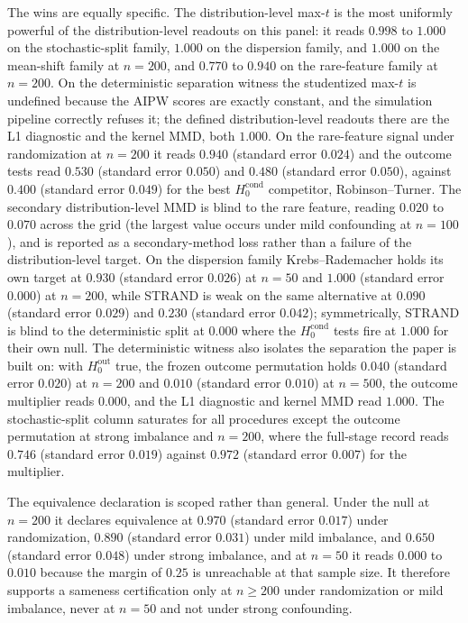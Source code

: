 The wins are equally specific. The distribution-level max-$t$ is the most uniformly powerful of the distribution-level readouts on this panel: it reads $0.998$ to $1.000$ on the stochastic-split family, $1.000$ on the dispersion family, and $1.000$ on the mean-shift family at $n=200$, and $0.770$ to $0.940$ on the rare-feature family at $n=200$. On the deterministic separation witness the studentized max-$t$ is undefined because the AIPW scores are exactly constant, and the simulation pipeline correctly refuses it; the defined distribution-level readouts there are the L1 diagnostic and the kernel MMD, both $1.000$. On the rare-feature signal under randomization at $n=200$ it reads $0.940$ (standard error $0.024$) and the outcome tests read $0.530$ (standard error $0.050$) and $0.480$ (standard error $0.050$), against $0.400$ (standard error $0.049$) for the best $H_0^{\mathrm{cond}}$ competitor, Robinson--Turner. The secondary distribution-level MMD is blind to the rare feature, reading $0.020$ to $0.070$ across the grid (the largest value occurs under mild confounding at $n=100$), and is reported as a secondary-method loss rather than a failure of the distribution-level target. On the dispersion family Krebs--Rademacher holds its own target at $0.930$ (standard error $0.026$) at $n=50$ and $1.000$ (standard error $0.000$) at $n=200$, while STRAND is weak on the same alternative at $0.090$ (standard error $0.029$) and $0.230$ (standard error $0.042$); symmetrically, STRAND is blind to the deterministic split at $0.000$ where the $H_0^{\mathrm{cond}}$ tests fire at $1.000$ for their own null. The deterministic witness also isolates the separation the paper is built on: with $H_0^{\mathrm{out}}$ true, the frozen outcome permutation holds $0.040$ (standard error $0.020$) at $n=200$ and $0.010$ (standard error $0.010$) at $n=500$, the outcome multiplier reads $0.000$, and the L1 diagnostic and kernel MMD read $1.000$. The stochastic-split column saturates for all procedures except the outcome permutation at strong imbalance and $n=200$, where the full-stage record reads $0.746$ (standard error $0.019$) against $0.972$ (standard error $0.007$) for the multiplier.

The equivalence declaration is scoped rather than general. Under the null at $n=200$ it declares equivalence at $0.970$ (standard error $0.017$) under randomization, $0.890$ (standard error $0.031$) under mild imbalance, and $0.650$ (standard error $0.048$) under strong imbalance, and at $n=50$ it reads $0.000$ to $0.010$ because the margin of $0.25$ is unreachable at that sample size. It therefore supports a sameness certification only at $n \ge 200$ under randomization or mild imbalance, never at $n=50$ and not under strong confounding.

